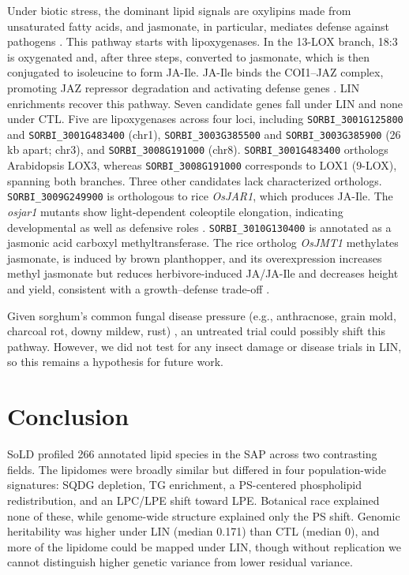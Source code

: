 \documentclass[9pt,twocolumn,twoside]{rilabRxiv}
\begin{document}
Under biotic stress, the dominant lipid signals are oxylipins made from unsaturated fatty acids, and jasmonate, in particular, mediates defense against pathogens \citep{Kuzniak2024LipidsPathogen}. This pathway starts with lipoxygenases. In the 13-LOX branch, 18:3 is oxygenated and, after three steps, converted to jasmonate, which is then conjugated to isoleucine to form JA-Ile. JA-Ile binds the COI1--JAZ complex, promoting JAZ repressor degradation and activating defense genes \citep{Li2022JasmonateReview}. LIN enrichments recover this pathway. Seven candidate genes fall under LIN and none under CTL. Five are lipoxygenases across four loci, including \texttt{SORBI\_3001G125800} and \texttt{SORBI\_3001G483400} (chr1), \texttt{SORBI\_3003G385500} and \texttt{SORBI\_3003G385900} (26 kb apart; chr3), and \texttt{SORBI\_3008G191000} (chr8). \texttt{SORBI\_3001G483400} orthologs Arabidopsis LOX3, whereas \texttt{SORBI\_3008G191000} corresponds to LOX1 (9-LOX), spanning both branches. Three other candidates lack characterized orthologs. \texttt{SORBI\_3009G249900} is orthologous to rice \textit{OsJAR1}, which produces JA-Ile. The \textit{osjar1} mutants show light-dependent coleoptile elongation, indicating developmental as well as defensive roles \citep{Riemann2008OsJAR1}. \texttt{SORBI\_3010G130400} is annotated as a jasmonic acid carboxyl methyltransferase. The rice ortholog \textit{OsJMT1} methylates jasmonate, is induced by brown planthopper, and its overexpression increases methyl jasmonate but reduces herbivore-induced JA/JA-Ile and decreases height and yield, consistent with a growth--defense trade-off \citep{Qi2016OsJMT1}.

Given sorghum’s common fungal disease pressure (e.g., anthracnose, grain mold, charcoal rot, downy mildew, rust) \citep{Khaskheli2025SorghumFungal}, an untreated trial could possibly shift this pathway. However, we did not test for any insect damage or disease trials in LIN, so this remains a hypothesis for future work.

\section*{Conclusion}

SoLD profiled 266 annotated lipid species in the SAP across two contrasting fields. The lipidomes were broadly similar but differed in four population-wide signatures: SQDG depletion, TG enrichment, a PS-centered phospholipid redistribution, and an LPC/LPE shift toward LPE. Botanical race explained none of these, while genome-wide structure explained only the PS shift. Genomic heritability was higher under LIN (median 0.171) than CTL (median 0), and more of the lipidome could be mapped under LIN, though without replication we cannot distinguish higher genetic variance from lower residual variance.
\end{document}
